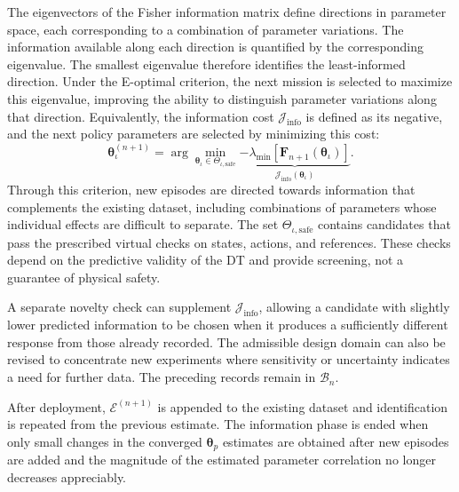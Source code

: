 \documentclass[journal]{IEEEtran}
\begin{document}
The eigenvectors of the Fisher information matrix define directions in parameter space, each corresponding to a combination of parameter variations. The information available along each direction is quantified by the corresponding eigenvalue. The smallest eigenvalue therefore identifies the least-informed direction. Under the E-optimal criterion, the next mission is selected to maximize this eigenvalue, improving the ability to distinguish parameter variations along that direction. Equivalently, the information cost $\mathcal J_{\mathrm{info}}$ is defined as its negative, and the next policy parameters are selected by minimizing this cost:
\begin{equation}
 \boldsymbol{\theta}_\iota^{(n+1)}
 =\arg\min_{\boldsymbol{\theta}_\iota\in\Theta_{\iota,\mathrm{safe}}}
 \underbrace{-\lambda_{\min}
 [\mathbf F_{n+1}(\boldsymbol{\theta}_\iota)]}
 _{\mathcal J_{\mathrm{info}}(\boldsymbol{\theta}_\iota)}.
 \label{eq:rt-e-optimal}
\end{equation} 
Through this criterion, new episodes are directed towards information that complements the existing dataset, including combinations of parameters whose individual effects are difficult to separate. The set $\Theta_{\iota,\mathrm{safe}}$ contains candidates that pass the prescribed virtual checks on states, actions, and references. These checks depend on the predictive validity of the DT and provide screening, not a guarantee of physical safety.

A separate novelty check can supplement $\mathcal J_{\mathrm{info}}$, allowing a candidate with slightly lower predicted information to be chosen when it produces a sufficiently different response from those already recorded. The admissible design domain can also be revised to concentrate new experiments where sensitivity or uncertainty indicates a need for further data. The preceding records remain in $\mathcal B_n$.

After deployment, $\mathcal E^{(n+1)}$ is appended to the existing dataset and identification is repeated from the previous estimate. The information phase is ended when only small changes in the converged $\boldsymbol{\theta}_p$ estimates are obtained after new episodes are added and the magnitude of the estimated parameter correlation no longer decreases appreciably. 
\end{document}
